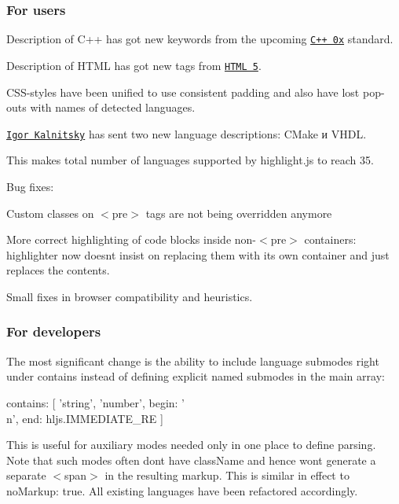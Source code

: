 \subsubsection*{For users}


\begin{DoxyItemize}
\item Description of C++ has got new keywords from the upcoming \href{http://ru.wikipedia.org/wiki/C%2B%2B0x}{\tt C++ 0x} standard.
\item Description of H\+T\+ML has got new tags from \href{http://en.wikipedia.org/wiki/HTML5}{\tt H\+T\+ML 5}.
\item C\+S\+S-\/styles have been unified to use consistent padding and also have lost pop-\/outs with names of detected languages.
\item \href{http://kalnitsky.org.ua/}{\tt Igor Kalnitsky} has sent two new language descriptions\+: C\+Make и V\+H\+DL.
\end{DoxyItemize}

This makes total number of languages supported by highlight.\+js to reach 35.

Bug fixes\+:


\begin{DoxyItemize}
\item Custom classes on {\ttfamily $<$pre$>$} tags are not being overridden anymore
\item More correct highlighting of code blocks inside non-\/{\ttfamily $<$pre$>$} containers\+: highlighter now doesn\textquotesingle{}t insist on replacing them with its own container and just replaces the contents.
\item Small fixes in browser compatibility and heuristics.
\end{DoxyItemize}

\subsubsection*{For developers}

The most significant change is the ability to include language submodes right under {\ttfamily contains} instead of defining explicit named submodes in the main array\+: \begin{DoxyVerb}contains: [
  'string',
  'number',
  {begin: '\\n', end: hljs.IMMEDIATE_RE}
]
\end{DoxyVerb}


This is useful for auxiliary modes needed only in one place to define parsing. Note that such modes often don\textquotesingle{}t have {\ttfamily class\+Name} and hence won\textquotesingle{}t generate a separate {\ttfamily $<$span$>$} in the resulting markup. This is similar in effect to {\ttfamily no\+Markup\+: true}. All existing languages have been refactored accordingly.

